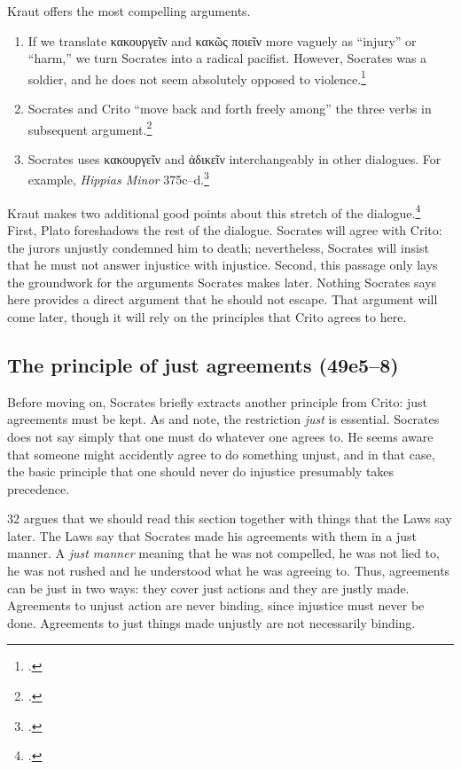 \documentclass[12pt,letterpaper]{article}
\begin{document}
Kraut offers the most compelling arguments.

\begin{enumerate}
    \item If we translate \textgreek{κακουργεῖν} and \textgreek{κακῶς ποιεῖν} more vaguely as ``injury'' or ``harm,'' we turn Socrates into a radical pacifist. However, Socrates was a soldier, and he does not seem absolutely opposed to violence.\footcite[][26, note 2]{kraut-socrates-state-1984}
    \item Socrates and Crito ``move back and forth freely among'' the three verbs in subsequent argument.\footcite[][29]{kraut-socrates-state-1984}
    \item Socrates uses \textgreek{κακουργεῖν} and \textgreek{ἀδικεῖν} interchangeably in other dialogues. For example, \textit{Hippias Minor} 375c--d.\footcite[][28, note 6]{kraut-socrates-state-1984}
\end{enumerate}

Kraut makes two additional good points about this stretch of the dialogue.\footcite[][28--29]{kraut-socrates-state-1984} First, Plato foreshadows the rest of the dialogue. Socrates will agree with Crito: the jurors unjustly condemned him to death; nevertheless, Socrates will insist that he must not answer injustice with injustice. Second, this passage only lays the groundwork for the arguments Socrates makes later. Nothing Socrates says here provides a direct argument that he should not escape. That argument will come later, though it will rely on the principles that Crito agrees to here.

\subsection*{The principle of just agreements (49e5--8)}

Before moving on, Socrates briefly extracts another principle from Crito: just agreements must be kept. As \cite{kraut-socrates-state-1984} and \cite{brickhouse-smith2004-plato-trial-of-socrates} note, the restriction \emph{just} is essential. Socrates does not say simply that one must do whatever one agrees to. He seems aware that someone might accidently agree to do something unjust, and in that case, the basic principle that one should never do injustice presumably takes precedence.

\cite{kraut-socrates-state-1984} 32 argues that we should read this section together with things that the Laws say later. The Laws say that Socrates made his agreements with them in a just manner. A \emph{just manner} meaning that he was not compelled, he was not lied to, he was not rushed and he understood what he was agreeing to. Thus, agreements can be just in two ways: they cover just actions and they are justly made. Agreements to unjust action are never binding, since injustice must never be done. Agreements to just things made unjustly are not necessarily binding.
\end{document}
